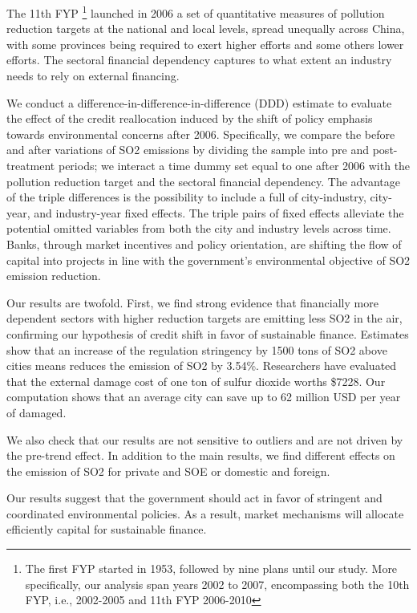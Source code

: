 \documentclass[12pt]{article}
\begin{document}
The 11th FYP \footnote{The first FYP started in 1953, followed by nine plans until our study. More specifically, our analysis span years 2002 to 2007, encompassing both the 10th FYP, i.e., 2002-2005 and 11th FYP 2006-2010} launched in 2006 a set of quantitative measures of pollution reduction targets at the national and local levels, spread unequally across China, with some provinces being required to exert higher efforts and some others lower efforts. The sectoral financial dependency captures to what extent an industry needs to rely on external financing.

We conduct a difference-in-difference-in-difference (DDD) estimate to evaluate the effect of the credit reallocation induced by the shift of policy emphasis towards environmental concerns after 2006. Specifically, we compare the before and after variations of SO2 emissions by dividing the sample into pre and post-treatment periods; we interact a time dummy set equal to one after 2006 with the pollution reduction target and the sectoral financial dependency. The advantage of the triple differences is the possibility to include a full of city-industry, city-year, and industry-year fixed effects. The triple pairs of fixed effects alleviate the potential omitted variables from both the city and industry levels across time. Banks, through market incentives and policy orientation, are shifting the flow of capital into projects in line with the government's environmental objective of SO2 emission reduction.

Our results are twofold. First, we find strong evidence that financially more dependent sectors with higher reduction targets are emitting less SO2 in the air, confirming our hypothesis of credit shift in favor of sustainable finance. Estimates show that an increase of the regulation stringency by 1500 tons of SO2 above cities means reduces the emission of SO2 by 3.54\%. Researchers have evaluated that the external damage cost of one ton of sulfur dioxide worths \$7228. Our computation shows that an average city can save up to 62 million USD per year of damaged.

We also check that our results are not sensitive to outliers and are not driven by the pre-trend effect. In addition to the main results, we find different effects on the emission of SO2 for private and SOE or domestic and foreign.

Our results suggest that the government should act in favor of stringent and coordinated environmental policies. As a result, market mechanisms will allocate efficiently capital for sustainable finance.
\end{document}
